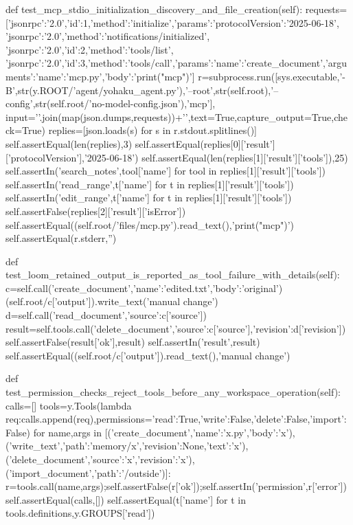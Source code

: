     def test_mcp_stdio_initialization_discovery_and_file_creation(self):
        requests=[{'jsonrpc':'2.0','id':1,'method':'initialize','params':{'protocolVersion':'2025-06-18'}},
            {'jsonrpc':'2.0','method':'notifications/initialized'}, {'jsonrpc':'2.0','id':2,'method':'tools/list'},
            {'jsonrpc':'2.0','id':3,'method':'tools/call','params':{'name':'create_document','arguments':{'name':'mcp.py','body':'print("mcp")'}}}]
        r=subprocess.run([sys.executable,'-B',str(y.ROOT/'agent/yohaku_agent.py'),'--root',str(self.root),'--config',str(self.root/'no-model-config.json'),'mcp'],
            input='\n'.join(map(json.dumps,requests))+'\n',text=True,capture_output=True,check=True)
        replies=[json.loads(s) for s in r.stdout.splitlines()]
        self.assertEqual(len(replies),3)
        self.assertEqual(replies[0]['result']['protocolVersion'],'2025-06-18')
        self.assertEqual(len(replies[1]['result']['tools']),25)
        self.assertIn('search_notes',{tool['name'] for tool in replies[1]['result']['tools']})
        self.assertIn('read_range',{t['name'] for t in replies[1]['result']['tools']})
        self.assertIn('edit_range',{t['name'] for t in replies[1]['result']['tools']})
        self.assertFalse(replies[2]['result']['isError'])
        self.assertEqual((self.root/'files/mcp.py').read_text(),'print("mcp")')
        self.assertEqual(r.stderr,'')

    def test_loom_retained_output_is_reported_as_tool_failure_with_details(self):
        c=self.call('create_document',{'name':'edited.txt','body':'original'})
        (self.root/c['output']).write_text('manual change')
        d=self.call('read_document',{'source':c['source']})
        result=self.tools.call('delete_document',{'source':c['source'],'revision':d['revision']})
        self.assertFalse(result['ok'],result)
        self.assertIn('result',result)
        self.assertEqual((self.root/c['output']).read_text(),'manual change')

    def test_permission_checks_reject_tools_before_any_workspace_operation(self):
        calls=[]
        tools=y.Tools(lambda req:calls.append(req),permissions={'read':True,'write':False,'delete':False,'import':False})
        for name,args in [('create_document',{'name':'x.py','body':'x'}),('write_text',{'path':'memory/x','revision':None,'text':'x'}),('delete_document',{'source':'x','revision':'x'}),('import_document',{'path':'/outside'})]:
            r=tools.call(name,args);self.assertFalse(r['ok']);self.assertIn('permission',r['error'])
        self.assertEqual(calls,[])
        self.assertEqual({t['name'] for t in tools.definitions},y.GROUPS['read'])

